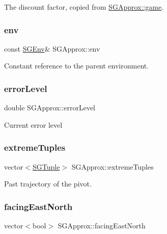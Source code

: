 The discount factor, copied from \hyperlink{classSGApprox_a0774e3ed0ff009809606a42c9e7ef727}{S\+G\+Approx\+::game}. \mbox{\label{classSGApprox_a6597417918c1e6c764f4f943c72af781}} 
\subsubsection{\texorpdfstring{env}{env}}
{\footnotesize\ttfamily const \hyperlink{classSGEnv}{S\+G\+Env}\& S\+G\+Approx\+::env\hspace{0.3cm}{\ttfamily [private]}}

Constant reference to the parent environment. \mbox{\label{classSGApprox_aee816ed49535cfc211aa34d0e6064e01}} 
\subsubsection{\texorpdfstring{error\+Level}{errorLevel}}
{\footnotesize\ttfamily double S\+G\+Approx\+::error\+Level\hspace{0.3cm}{\ttfamily [private]}}

Current error level \mbox{\label{classSGApprox_ab0e2c4678401f806922ac64667ad5ff6}} 
\subsubsection{\texorpdfstring{extreme\+Tuples}{extremeTuples}}
{\footnotesize\ttfamily vector$<$\hyperlink{classSGTuple}{S\+G\+Tuple}$>$ S\+G\+Approx\+::extreme\+Tuples\hspace{0.3cm}{\ttfamily [private]}}

Past trajectory of the pivot. \mbox{\label{classSGApprox_a44ce2e0eba77e1c7c155f38662cba9d0}} 
\subsubsection{\texorpdfstring{facing\+East\+North}{facingEastNorth}}
{\footnotesize\ttfamily vector$<$bool$>$ S\+G\+Approx\+::facing\+East\+North\hspace{0.3cm}{\ttfamily [private]}}

